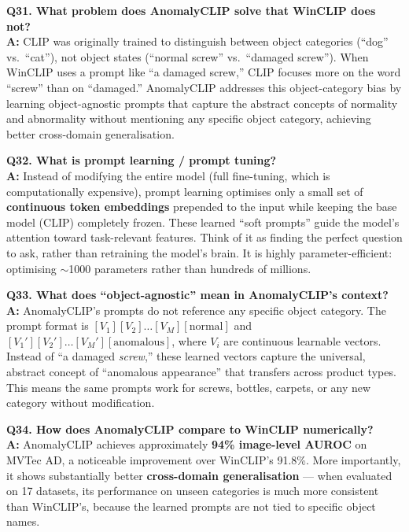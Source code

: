 \documentclass[12pt, a4paper]{article}
\begin{document}
\begin{qa}
\textbf{Q31. What problem does AnomalyCLIP solve that WinCLIP does not?}\\[4pt]
\textbf{A:} CLIP was originally trained to distinguish between object categories (``dog'' vs.\ ``cat''), not object states (``normal screw'' vs.\ ``damaged screw''). When WinCLIP uses a prompt like ``a damaged screw,'' CLIP focuses more on the word ``screw'' than on ``damaged.'' AnomalyCLIP addresses this object-category bias by learning object-agnostic prompts that capture the abstract concepts of normality and abnormality without mentioning any specific object category, achieving better cross-domain generalisation.
\end{qa}

\begin{qa}
\textbf{Q32. What is prompt learning / prompt tuning?}\\[4pt]
\textbf{A:} Instead of modifying the entire model (full fine-tuning, which is computationally expensive), prompt learning optimises only a small set of \textbf{continuous token embeddings} prepended to the input while keeping the base model (CLIP) completely frozen. These learned ``soft prompts'' guide the model's attention toward task-relevant features. Think of it as finding the perfect question to ask, rather than retraining the model's brain. It is highly parameter-efficient: optimising $\sim$1000 parameters rather than hundreds of millions.
\end{qa}

\begin{qa}
\textbf{Q33. What does ``object-agnostic'' mean in AnomalyCLIP's context?}\\[4pt]
\textbf{A:} AnomalyCLIP's prompts do not reference any specific object category. The prompt format is $[V_1][V_2]\ldots[V_M][\text{normal}]$ and $[V_1'][V_2']\ldots[V_M'][\text{anomalous}]$, where $V_i$ are continuous learnable vectors. Instead of ``a damaged \textit{screw},'' these learned vectors capture the universal, abstract concept of ``anomalous appearance'' that transfers across product types. This means the same prompts work for screws, bottles, carpets, or any new category without modification.
\end{qa}

\begin{qa}
\textbf{Q34. How does AnomalyCLIP compare to WinCLIP numerically?}\\[4pt]
\textbf{A:} AnomalyCLIP achieves approximately \textbf{94\% image-level AUROC} on MVTec AD, a noticeable improvement over WinCLIP's 91.8\%. More importantly, it shows substantially better \textbf{cross-domain generalisation} --- when evaluated on 17 datasets, its performance on unseen categories is much more consistent than WinCLIP's, because the learned prompts are not tied to specific object names.
\end{qa}
\end{document}
